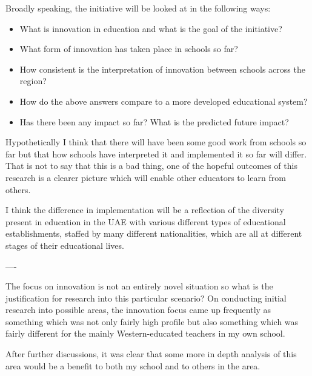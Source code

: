 Broadly speaking, the initiative will be looked at in the following ways: 

\begin{itemize}
\item What is innovation in education and what is the goal of the initiative?
\item What form of innovation has taken place in schools so far?
\item How consistent is the interpretation of innovation between schools across the region?
\item How do the above answers compare to a more developed educational system?
\item Has there been any impact so far? What is the predicted future impact?

\end{itemize}

Hypothetically I think that there will have been some good work from schools so far but that how schools have interpreted it and implemented it so far will differ. That is not to say that this is a bad thing, one of the hopeful outcomes of this research is a clearer picture which will enable other educators to learn from others.

I think the difference in implementation will be a reflection of the diversity present in education in the UAE with various different types of educational establishments, staffed by many different nationalities, which are all at different stages of their educational lives.

----


The focus on innovation is not an entirely novel situation so what is the justification for research into this particular scenario? On conducting initial research into possible areas, the innovation focus came up frequently as something which was not only fairly high profile but also something which was fairly different for the mainly Western-educated teachers in my own school. 

After further discussions, it was clear that some more in depth analysis of this area would be a benefit to both my school and to others in the area.
